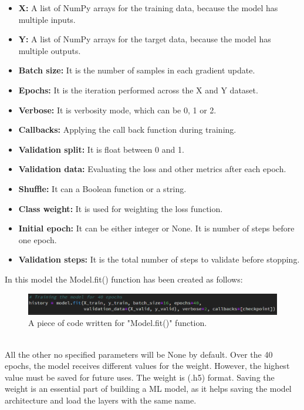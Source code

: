 \begin{itemize}
    \item \textbf{X:} A list of NumPy arrays for the training data, because the model has multiple inputs.
    \item \textbf{Y:} A list of NumPy arrays for the target data, because the model has multiple outputs.
    \item \textbf{Batch size:} It is the number of samples in each gradient update.
    \item \textbf{Epochs:} It is the iteration performed across the X and Y dataset.
    \item \textbf{Verbose:} It is verbosity mode, which can be 0, 1 or 2.
    \item \textbf{Callbacks:} Applying the call back function during training.
    \item \textbf{Validation split:} It is float between 0 and 1.
    \item \textbf{Validation data:} Evaluating the loss and other metrics after each epoch.
    \item \textbf{Shuffle:} It can a Boolean function or a string.
    \item \textbf{Class weight:} It is used for weighting the loss function.
    \item \textbf{Initial epoch:} It can be either integer or None. It is number of steps before one epoch.
    \item \textbf{Validation steps:} It is the total number of steps to validate before stopping.
\end{itemize}
 In this model the Model.fit() function has been created as follows:
 \begin{figure}[ht]
    \centering
    \includegraphics{Figures/fit1}
    \decoRule
    \caption [A piece of code written for "Model.fit()" function.]{A piece of code written for "Model.fit()" function.}
    \label{fig:la}
    \end{figure}\hfill \\
 All the other no specified parameters will be None by default.
 Over the 40 epochs, the model receives different values for the weight. However, the highest value must be saved for future uses. The weight is (.h5) format. Saving the weight is an essential part of building a ML model, as it helps saving the model architecture and load the layers with the same name.
